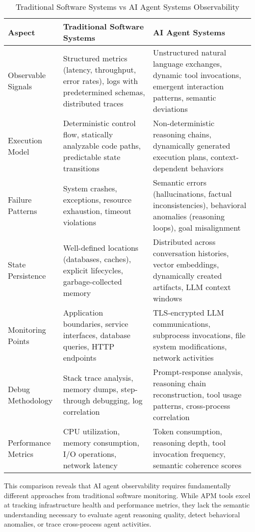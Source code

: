 \documentclass[sigplan,screen，review,9pt]{acmart}
\begin{document}
\begin{table*}[t]
  \caption{Traditional Software Systems vs AI Agent Systems Observability}
  \label{tab:diff}
  \begin{tabularx}{\linewidth}{@{}>{\raggedright\arraybackslash}p{2.85cm}X X@{}}
    \toprule
    \textbf{Aspect} &
    \textbf{Traditional Software Systems} &
    \textbf{AI Agent Systems} \\
    \midrule
    Observable Signals &
    Structured metrics (latency, throughput, error rates), logs with predetermined schemas, distributed traces &
    Unstructured natural language exchanges, dynamic tool invocations, emergent interaction patterns, semantic deviations \\
    Execution Model &
    Deterministic control flow, statically analyzable code paths, predictable state transitions &
    Non-deterministic reasoning chains, dynamically generated execution plans, context-dependent behaviors \\
    Failure Patterns &
    System crashes, exceptions, resource exhaustion, timeout violations &
    Semantic errors (hallucinations, factual inconsistencies), behavioral anomalies (reasoning loops), goal misalignment \\
    State Persistence &
    Well-defined locations (databases, caches), explicit lifecycles, garbage-collected memory &
    Distributed across conversation histories, vector embeddings, dynamically created artifacts, LLM context windows \\
    Monitoring Points &
    Application boundaries, service interfaces, database queries, HTTP endpoints &
    TLS-encrypted LLM communications, subprocess invocations, file system modifications, network activities \\
    Debug Methodology &
    Stack trace analysis, memory dumps, step-through debugging, log correlation &
    Prompt-response analysis, reasoning chain reconstruction, tool usage patterns, cross-process correlation \\
    Performance Metrics &
    CPU utilization, memory consumption, I/O operations, network latency &
    Token consumption, reasoning depth, tool invocation frequency, semantic coherence scores \\
    \bottomrule
  \end{tabularx}
\end{table*}

This comparison reveals that AI agent observability requires fundamentally different approaches from traditional software monitoring. While APM tools excel at tracking infrastructure health and performance metrics, they lack the semantic understanding necessary to evaluate agent reasoning quality, detect behavioral anomalies, or trace cross-process agent activities.
\end{document}
